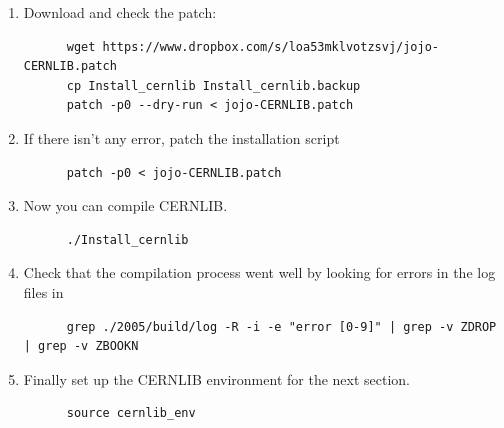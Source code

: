 \begin{enumerate}[resume]
  
\item Download and check the patch:
\begin{lstlisting}
      wget https://www.dropbox.com/s/loa53mklvotzsvj/jojo-CERNLIB.patch
      cp Install_cernlib Install_cernlib.backup
      patch -p0 --dry-run < jojo-CERNLIB.patch
\end{lstlisting}
\item If there isn’t any error, patch the installation script
\begin{lstlisting}
      patch -p0 < jojo-CERNLIB.patch
\end{lstlisting}
\item Now you can compile CERNLIB.\@ 
\begin{lstlisting}
      ./Install_cernlib
\end{lstlisting}
\item Check that the compilation process went well by looking for
  errors in the log files in 
  \begin{lstlisting}
      grep ./2005/build/log -R -i -e "error [0-9]" | grep -v ZDROP | grep -v ZBOOKN
\end{lstlisting}
\item Finally set up the CERNLIB environment for the next section.
\begin{lstlisting}
      source cernlib_env
\end{lstlisting}
\end{enumerate}

